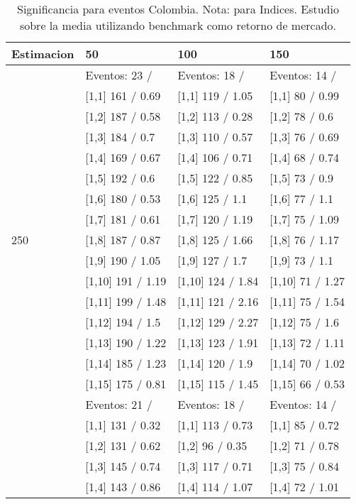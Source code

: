 \begin{table}

\caption{Significancia para eventos Colombia. Nota: para Indices. Estudio sobre la media utilizando benchmark como retorno de mercado.}
\centering
\begin{tabular}[t]{llll}
\toprule
Estimacion & 50 & 100 & 150\\
\midrule
 & Eventos:  23 / & Eventos:  18 / & Eventos:  14 /\\
 & {}[1,1] 161  / 0.69 & {}[1,1] 119  / 1.05 & {}[1,1] 80  / 0.99\\
 & {}[1,2] 187  / 0.58 & {}[1,2] 113  / 0.28 & {}[1,2] 78  / 0.6\\
 & {}[1,3] 184  / 0.7 & {}[1,3] 110  / 0.57 & {}[1,3] 76  / 0.69\\
 & {}[1,4] 169  / 0.67 & {}[1,4] 106  / 0.71 & {}[1,4] 68  / 0.74\\
\addlinespace
 & {}[1,5] 192  / 0.6 & {}[1,5] 122  / 0.85 & {}[1,5] 73  / 0.9\\
 & {}[1,6] 180  / 0.53 & {}[1,6] 125  / 1.1 & {}[1,6] 77  / 1.1\\
 & {}[1,7] 181  / 0.61 & {}[1,7] 120  / 1.19 & {}[1,7] 75  / 1.09\\
250 & {}[1,8] 187  / 0.87 & {}[1,8] 125  / 1.66 & {}[1,8] 76  / 1.17\\
 & {}[1,9] 190  / 1.05 & {}[1,9] 127  / 1.7 & {}[1,9] 73  / 1.1\\
\addlinespace
 & {}[1,10] 191  / 1.19 & {}[1,10] 124  / 1.84 & {}[1,10] 71  / 1.27\\
 & {}[1,11] 199  / 1.48 & {}[1,11] 121  / 2.16 & {}[1,11] 75  / 1.54\\
 & {}[1,12] 194  / 1.5 & {}[1,12] 129  / 2.27 & {}[1,12] 75  / 1.6\\
 & {}[1,13] 190  / 1.22 & {}[1,13] 123  / 1.91 & {}[1,13] 72  / 1.11\\
 & {}[1,14] 185  / 1.23 & {}[1,14] 120  / 1.9 & {}[1,14] 70  / 1.02\\
\addlinespace
 & {}[1,15] 175  / 0.81 & {}[1,15] 115  / 1.45 & {}[1,15] 66  / 0.53\\
 & Eventos:  21 / & Eventos:  18 / & Eventos:  14 /\\
 & {}[1,1] 131  / 0.32 & {}[1,1] 113  / 0.73 & {}[1,1] 85  / 0.72\\
 & {}[1,2] 131  / 0.62 & {}[1,2] 96  / 0.35 & {}[1,2] 71  / 0.78\\
 & {}[1,3] 145  / 0.74 & {}[1,3] 117  / 0.71 & {}[1,3] 75  / 0.84\\
\addlinespace
 & {}[1,4] 143  / 0.86 & {}[1,4] 114  / 1.07 & {}[1,4] 72  / 1.01\\

\end{tabular}
\end{table}
